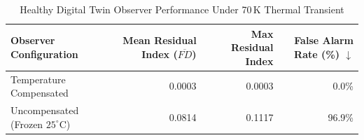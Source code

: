 \begin{table}[htbp]
\centering
\caption{Healthy Digital Twin Observer Performance Under 70\,K Thermal Transient}
\label{tab:temp_compensation}
\begin{tabular}{lrrr}
\toprule
Observer Configuration & Mean Residual Index ($\overline{FD}$) & Max Residual Index & False Alarm Rate (\%) $\downarrow$ \\
\midrule
Temperature Compensated & 0.0003 & 0.0003 & 0.0\% \\
Uncompensated (Frozen $25^\circ$C) & 0.0814 & 0.1117 & 96.9\% \\
\bottomrule
\end{tabular}
\end{table}